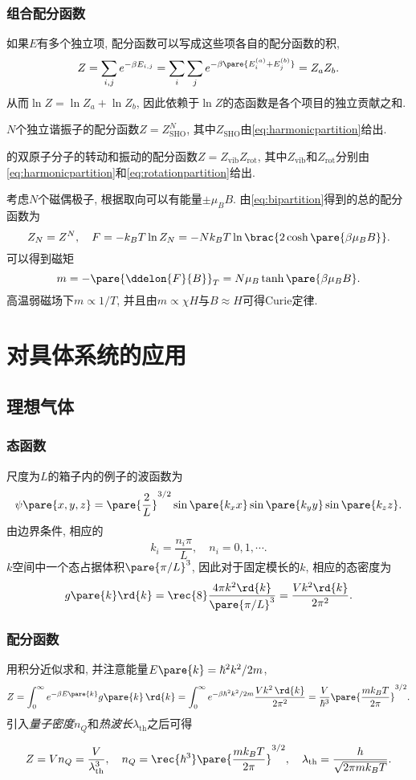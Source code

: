 \documentclass[../Thermal.tex]{subfiles}
\begin{document}
\subsubsection{组合配分函数}
如果$E$有多个独立项, 配分函数可以写成这些项各自的配分函数的积,
\[ Z = \sum_{i,j} e^{-\beta E_{i,j}} = \sum_i\sum_j e^{-\beta\pare{E_i^{(a)} + E_j^{(b)}}} = Z_a Z_b. \]
从而$\ln Z = \ln Z_a + \ln Z_b$, 因此依赖于$\ln Z$的态函数是各个项目的独立贡献之和.
\begin{ex}
$N$个独立谐振子的配分函数$Z = Z_{\mathrm{SHO}}^N$, 其中$Z_{\mathrm{SHO}}$由\eqref{eq:harmonicpartition}给出.
\end{ex}
\begin{ex}
\label{ex:twoatomvibrot}
的双原子分子的转动和振动的配分函数$Z = Z_{\mathrm{vib}}Z_{\mathrm{rot}}$, 其中$Z_{\mathrm{vib}}$和$Z_{\mathrm{rot}}$分别由\eqref{eq:harmonicpartition}和\eqref{eq:rotationpartition}给出.
\end{ex}
\begin{ex}[Curie定律]
考虑$N$个磁偶极子, 根据取向可以有能量$\pm \mu_B B$. 由\eqref{eq:bipartition}得到的总的配分函数为
\[ Z_N = Z^N,\quad F = -k_BT\ln Z_N = -Nk_BT\ln\brac{2\cosh\pare{\beta\mu_B B}}. \]
可以得到磁矩
\[ m = -\pare{\ddelon{F}{B}}_T = N\mu_B \tanh\pare{\beta \mu_B B}. \]
高温弱磁场下$m\propto 1/T$, 并且由$m\propto \chi H$与$B\approx H$可得Curie定律.
\end{ex}
\section{对具体系统的应用}
\subsection{理想气体}
\subsubsection{态函数}
尺度为$L$的箱子内的例子的波函数为
\[ \psi\pare{x,y,z} = \pare{\frac{2}{L}}^{3/2} \sin\pare{k_x x}\sin\pare{k_y y}\sin\pare{k_z z}. \]
由边界条件, 相应的
\[ k_i = \frac{n_i \pi}{L}, \quad n_i = 0,1,\cdots. \]
$k$空间中一个态占据体积$\pare{\pi/L}^3$, 因此对于固定模长的$k$, 相应的态密度为
\begin{equation}
\label{eq:statedensity}
g\pare{k}\rd{k} = \rec{8}\frac{4\pi k^2\rd{k}}{\pare{\pi/L}^3} = \frac{Vk^2\rd{k}}{2\pi^2}.
\end{equation}
\subsubsection{配分函数}
用积分近似求和, 并注意能量$E\pare{k} = \hbar^2 k^2/2m$,
\[ Z = \int_0^\infty e^{-\beta E\pare{k}}g\pare{k}\,\rd{k} = \int_0^\infty e^{-\beta \hbar^2 k^2/2m}\frac{Vk^2\,\rd{k}}{2\pi^2} = \frac{V}{\hbar^3}\pare{\frac{mk_BT}{2\pi}}^{3/2}. \]
引入\emph{量子密度}$n_Q$和\emph{热波长}$\lambda_{\mathrm{th}}$之后可得
\begin{finale}
\begin{equation}
\label{eq:Zinlambdath}
Z = Vn_Q = \frac{V}{\lambda_{\mathrm{th}}^3},\quad n_Q = \rec{\hbar^3}\pare{\frac{mk_BT}{2\pi}}^{3/2},\quad \lambda_{\mathrm{th}} = \frac{h}{\sqrt{2\pi mk_B T}}.
\end{equation}
\end{finale}
\end{document}
